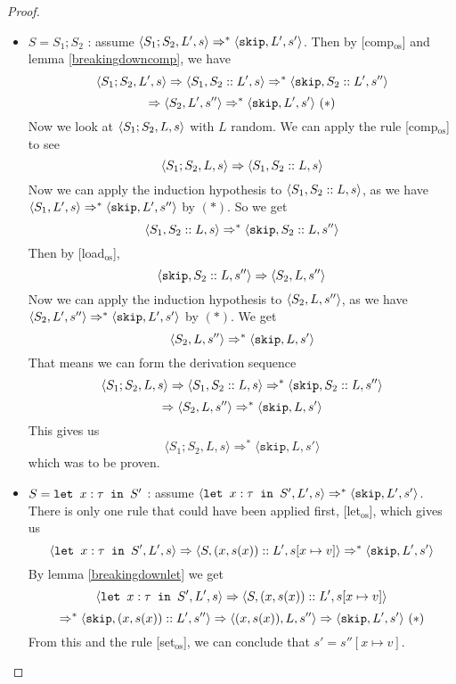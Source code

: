 \begin{proof}
\begin{itemize}[noitemsep]
    \item $S = S_1; S_2$ : assume $\langle  S_1;S_2, L',  s \rangle \Rightarrow ^{*} \langle \texttt{skip}, L', s' \rangle$. Then by [comp$_{\textrm{os}}$] and lemma \ref{breakingdowncomp}, we have $$\langle S_1;S_2, L', s \rangle \Rightarrow \langle S_1, S_2::L', s \rangle \Rightarrow ^{*} \langle \texttt{skip}, S_2::L', s'' \rangle$$ $$\Rightarrow \langle S_2, L', s'' \rangle \Rightarrow ^{*} \langle \texttt{skip}, L', s' \rangle ~( * )$$
    Now we look at $\langle S_1;S_2, L, s \rangle$ with $L$ random. We can apply the rule [comp$_{\textrm{os}}$] to see $$\langle S_1;S_2, L, s \rangle \Rightarrow \langle S_1, S_2::L, s \rangle$$ Now we can apply the induction hypothesis to $\langle S_1, S_2::L, s \rangle$, as we have $\langle S_1, L', s \rangle \Rightarrow ^{*} \langle \texttt{skip}, L', s'' \rangle$ by $( * )$. So we get 
    $$\langle S_1, S_2::L, s \rangle \Rightarrow ^{*} \langle \texttt{skip}, S_2::L, s'' \rangle$$
    Then by [load$_{\textrm{os}}$], $$\langle \texttt{skip}, S_2::L, s'' \rangle \Rightarrow \langle S_2, L, s'' \rangle$$
    Now we can apply the induction hypothesis to $\langle S_2, L, s'' \rangle$, as we have $\langle S_2, L', s'' \rangle \Rightarrow ^{*} \langle \texttt{skip}, L', s' \rangle$ by $( * )$. We get 
    $$\langle S_2, L, s'' \rangle \Rightarrow ^{*} \langle \texttt{skip}, L, s' \rangle$$
    That means we can form the derivation sequence $$\langle S_1;S_2, L, s \rangle \Rightarrow \langle S_1, S_2::L, s \rangle \Rightarrow ^{*} \langle \texttt{skip}, S_2::L, s'' \rangle $$ $$ \Rightarrow \langle S_2, L, s'' \rangle \Rightarrow ^{*} \langle \texttt{skip}, L, s' \rangle$$
    This gives us 
    $$\langle S_1;S_2, L, s \rangle  \Rightarrow ^{*} \langle \texttt{skip}, L, s'\rangle$$
    which was to be proven. 
        
    \item $S = \texttt{let }x : \tau \texttt{ in } S'$ : assume $\langle \texttt{let }x : \tau \texttt{ in } S', L', s \rangle \Rightarrow ^{*} \langle \texttt{skip}, L', s' \rangle$. There is only one rule that could have been applied first, [let$_{\textrm{os}}$], which gives us 
    $$\langle \texttt{let }x : \tau \texttt{ in } S', L', s \rangle \Rightarrow \langle S, (x,s(x))::L', s[x\mapsto v] \rangle \Rightarrow ^{*} \langle \texttt{skip}, L', s' \rangle$$
    By lemma \ref{breakingdownlet} we get 
    $$\langle \texttt{let }x : \tau \texttt{ in } S', L', s \rangle \Rightarrow \langle S, (x,s(x))::L', s[x\mapsto v] \rangle$$ $$\Rightarrow ^{*} \langle \texttt{skip}, (x,s(x))::L', s'' \rangle \Rightarrow \langle (x,s(x)), L, s'' \rangle \Rightarrow \langle \texttt{skip}, L', s' \rangle ~ ( * )$$
    From this and the rule [set$_{\textrm{os}}$], we can conclude that $s' = s''[x\mapsto v]$.
    

\end{itemize}
\end{proof}
